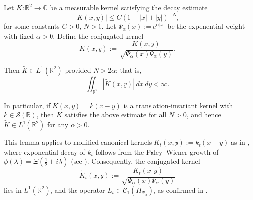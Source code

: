 \begin{lemma}
\label{lem:L1_integrability_conjugated_kernel}
Let \( K \colon \mathbb{R}^2 \to \mathbb{C} \) be a measurable kernel satisfying the decay estimate
\[
|K(x,y)| \le C (1 + |x| + |y|)^{-N},
\]
for some constants \( C > 0 \), \( N > 0 \). Let \( \Psi_\alpha(x) := e^{\alpha |x|} \) be the exponential weight with fixed \( \alpha > 0 \). Define the conjugated kernel
\[
\widetilde{K}(x,y) := \frac{K(x,y)}{\sqrt{\Psi_\alpha(x)\Psi_\alpha(y)}}.
\]

Then \( \widetilde{K} \in L^1(\mathbb{R}^2) \) provided \( N > 2\alpha \); that is,
\[
\iint_{\mathbb{R}^2} |\widetilde{K}(x,y)|\, dx\,dy < \infty.
\]

\medskip
\noindent
In particular, if \( K(x,y) = k(x - y) \) is a translation-invariant kernel with \( k \in \mathcal{S}(\mathbb{R}) \), then \( K \) satisfies the above estimate for all \( N > 0 \), and hence \( \widetilde{K} \in L^1(\mathbb{R}^2) \) for any \( \alpha > 0 \).

\medskip
\noindent
This lemma applies to mollified canonical kernels \( K_t(x,y) := k_t(x - y) \) as in , where exponential decay of \( k_t \) follows from the Paley–Wiener growth of \( \phi(\lambda) = \Xi(\tfrac{1}{2} + i\lambda) \) (see ). Consequently, the conjugated kernel
\[
\widetilde{K}_t(x,y) := \frac{K_t(x,y)}{\sqrt{\Psi_\alpha(x)\Psi_\alpha(y)}}
\]
lies in \( L^1(\mathbb{R}^2) \), and the operator \( L_t \in \mathcal{C}_1(H_{\Psi_\alpha}) \), as confirmed in .
\end{lemma}
